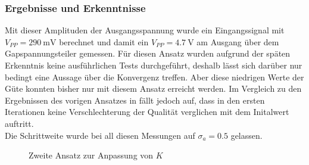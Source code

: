 \documentclass[../Report.tex]{subfiles}
\begin{document}
\subsubsection*{Ergebnisse und Erkenntnisse}
\label{subsubsec:opt.adjusta.kleiner.results}
Mit dieser Amplituden der Ausgangsspannung wurde ein Eingangssignal mit $V_{PP} = \SI{290}{\mV}$ berechnet und damit ein $V_{PP} = \SI{4.7}{\V}$ am Ausgang über dem Gapspannungsteiler gemessen. Für diesen Ansatz wurden aufgrund der späten Erkenntnis keine ausführlichen Tests durchgeführt, deshalb lässt sich darüber nur bedingt eine Aussage über die Konvergenz treffen. Aber diese niedrigen Werte der Güte konnten bisher nur mit diesem Ansatz erreicht werden. Im Vergleich zu den Ergebnissen des vorigen Ansatzes in  fällt jedoch auf, dass in den ersten Iterationen keine Verschlechterung der Qualität verglichen mit dem Initalwert auftritt.
\\
Die Schrittweite wurde bei all diesen Messungen auf $\sigma_a = 0.5$ gelassen.
\begin{figure}[H]
\begin{subfigure}{0.5 \textwidth}
	\setlength\figureheight{7.5cm}
	\setlength\figurewidth{7.5cm}
    
	\label{fig:opt.kleinerBereich.K}
\end{subfigure}
\begin{subfigure}{0.5 \textwidth}
	\setlength\figureheight{7.5cm}
	\setlength\figurewidth{7.5cm}
    
	\label{fig:opt.kleinerBereich.Q}
\end{subfigure}
\label{fig:opt.Kennlinie}
\caption{Zweite Ansatz zur Anpassung von $K$}
\end{figure}
\end{document}
